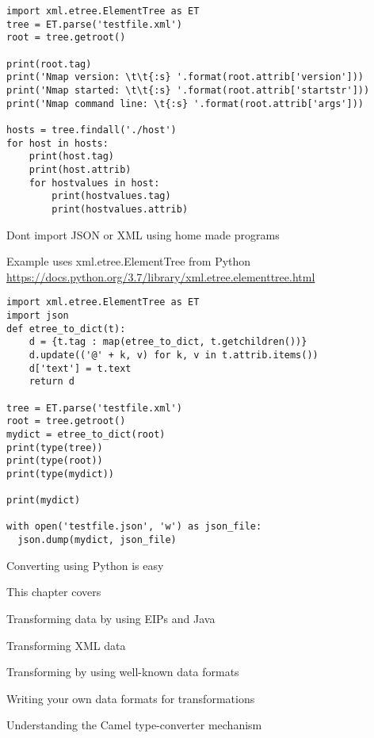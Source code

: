\documentclass[Screen16to9,17pt]{foils}
\begin{document}

\begin{verbatim}
import xml.etree.ElementTree as ET
tree = ET.parse('testfile.xml')
root = tree.getroot()

print(root.tag)
print('Nmap version: \t\t{:s} '.format(root.attrib['version']))
print('Nmap started: \t\t{:s} '.format(root.attrib['startstr']))
print('Nmap command line: \t{:s} '.format(root.attrib['args']))

hosts = tree.findall('./host')
for host in hosts:
    print(host.tag)
    print(host.attrib)
    for hostvalues in host:
        print(hostvalues.tag)
        print(hostvalues.attrib)
\end{verbatim}

\begin{list2}
\item Dont import JSON or XML using home made programs
\item Example uses xml.etree.ElementTree from Python \url{https://docs.python.org/3.7/library/xml.etree.elementtree.html}
\end{list2}


\begin{verbatim}
import xml.etree.ElementTree as ET
import json
def etree_to_dict(t):
    d = {t.tag : map(etree_to_dict, t.getchildren())}
    d.update(('@' + k, v) for k, v in t.attrib.items())
    d['text'] = t.text
    return d

tree = ET.parse('testfile.xml')
root = tree.getroot()
mydict = etree_to_dict(root)
print(type(tree))
print(type(root))
print(type(mydict))

print(mydict)

with open('testfile.json', 'w') as json_file:
  json.dump(mydict, json_file)
\end{verbatim}

Converting using Python is easy





This chapter covers
\begin{list2}
\item Transforming data by using EIPs and Java
\item Transforming XML data
\item Transforming by using well-known data formats
\item Writing your own data formats for
transformations
\item Understanding the Camel type-converter
mechanism
\end{list2}
\end{document}
